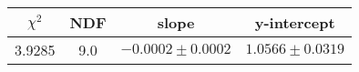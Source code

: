 \begin{tabular}{|c|c|c|c|}

\hline
$\chi^{2}$ & NDF & slope & y-intercept  \\
\hline
3.9285 & 9.0 & $-0.0002\pm0.0002$ & $1.0566\pm0.0319$ \\
\hline

\end{tabular}